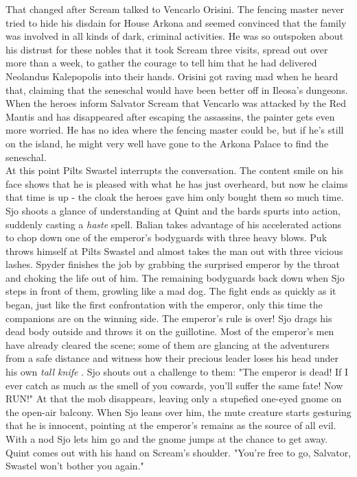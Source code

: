 That changed after Scream talked to Vencarlo Orisini. The fencing master never tried to hide his disdain for House Arkona and seemed convinced that the family was involved in all kinds of dark, criminal activities. He was so outspoken about his distrust for these nobles that it took Scream three visits, spread out over more than a week, to gather the courage to tell him that he had delivered Neolandus Kalepopolis into their hands. Orisini got raving mad when he heard that, claiming that the seneschal would have been better off in Ileosa's dungeons.\\

When the heroes inform Salvator Scream that Vencarlo was attacked by the Red Mantis and has disappeared after escaping the assassins, the painter gets even more worried. He has no idea where the fencing master could be, but if he's still on the island, he might very well have gone to the Arkona Palace to find the seneschal.\\

At this point Pilts Swastel interrupts the conversation. The content smile on his face shows that he is pleased with what he has just overheard, but now he claims that time is up - the cloak the heroes gave him only bought them so much time. Sjo shoots a glance of understanding at Quint and the bards spurts into action, suddenly casting a {\itshape haste} spell. Balian takes advantage of his accelerated actions to chop down one of the emperor's bodyguards with three heavy blows. Puk throws himself at Pilts Swastel and almost takes the man out with three vicious lashes. Spyder finishes the job by grabbing the surprised emperor by the throat and choking the life out of him. The remaining bodyguards back down when Sjo steps in front of them, growling like a mad dog. The fight ends as quickly as it began, just like the first confrontation with the emperor, only this time the companions are on the winning side. The emperor's rule is over! Sjo drags his dead body outside and throws it on the guillotine. Most of the emperor's men have already cleared the scene; some of them are glancing at the adventurers from a safe distance and witness how their precious leader loses his head under his own  {\itshape tall knife} . Sjo shouts out a challenge to them: "The emperor is dead! If I ever catch as much as the smell of you cowards, you'll suffer the same fate! Now RUN!" At that the mob disappears, leaving only a stupefied one-eyed gnome on the open-air balcony. When Sjo leans over him, the mute creature starts gesturing that he is innocent, pointing at the emperor's remains as the source of all evil. With a nod Sjo lets him go and the gnome jumps at the chance to get away. Quint comes out with his hand on Scream's shoulder. "You're free to go, Salvator, Swastel won't bother you again."\\

